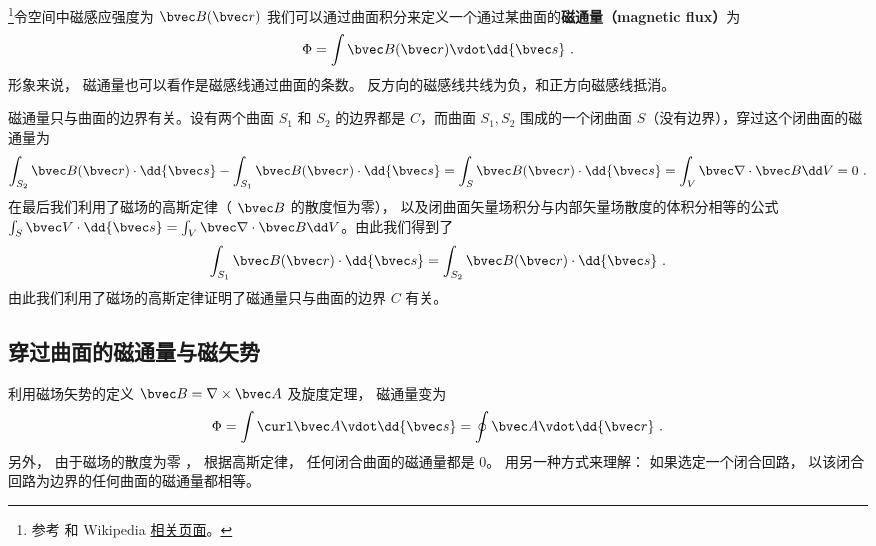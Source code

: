
\begin{issues}
\issueDraft
{}
\end{issues}


\footnote{参考 \cite{GriffE} 和 Wikipedia \href{https://en.wikipedia.org/wiki/Magnetic_flux}{相关页面}。}令空间中磁感应强度为 $\bvec B(\bvec r)$ 我们可以通过曲面积分来定义一个通过某曲面的\textbf{磁通量（magnetic flux）}为
\begin{equation}
\Phi  = \int \bvec B(\bvec r) \vdot \dd{\bvec s}~.
\end{equation}
形象来说， 磁通量也可以看作是磁感线通过曲面的条数。 反方向的磁感线共线为负，和正方向磁感线抵消。

磁通量只与曲面的边界有关。设有两个曲面 $S_1$ 和 $S_2$ 的边界都是 $C$，而曲面 $S_1,S_2$ 围成的一个闭曲面 $S$（没有边界），穿过这个闭曲面的磁通量为
\begin{equation}
\int_{S_2} \bvec B(\bvec r)\cdot \dd {\bvec s }- \int_{S_1} \bvec B(\bvec r)\cdot \dd {\bvec s} = \int_{S} \bvec B(\bvec r)\cdot \dd {\bvec s}=\int_V \bvec \nabla \cdot \bvec B \dd V=0~.
\end{equation}
在最后我们利用了磁场的高斯定律（ $\bvec B$ 的散度恒为零）， 以及闭曲面矢量场积分与内部矢量场散度的体积分相等的公式 $\int_S \bvec V\cdot \dd{\bvec s}=\int_V \bvec \nabla\cdot \bvec B \dd V$。由此我们得到了
\begin{equation}
\int_{S_1} \bvec B(\bvec r)\cdot \dd {\bvec s}
=
\int_{S_2} \bvec B(\bvec r)\cdot \dd {\bvec s }~.
\end{equation}
由此我们利用了磁场的高斯定律证明了磁通量只与曲面的边界 $C$ 有关。
\subsection{穿过曲面的磁通量与磁矢势}
利用磁场矢势的定义 $\bvec B=\nabla\times \bvec A$ %
及旋度定理， %
磁通量变为
\begin{equation} \label{eq_BFlux_2}
\Phi  = \int \curl \bvec A \vdot \dd{\bvec s}  = \oint \bvec A \vdot \dd{\bvec r}~.
\end{equation}
另外， 由于磁场的散度为零%
， 根据高斯定律， 任何闭合曲面的磁通量都是 0。 用另一种方式来理解： 如果选定一个闭合回路， 以该闭合回路为边界的任何曲面的磁通量都相等。

